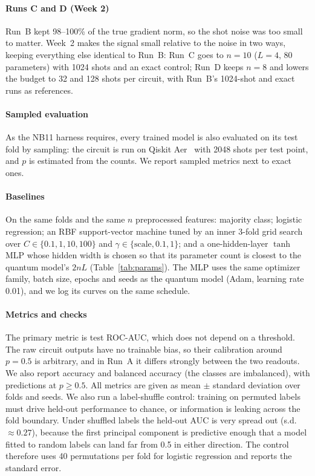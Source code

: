 \documentclass[conference]{IEEEtran}
\begin{document}
\paragraph*{Runs C and D (Week 2)} Run~B kept 98--100\% of the true gradient
norm, so the shot noise was too small to matter. Week~2 makes the signal
small relative to the noise in two ways, keeping everything else identical to Run~B:
Run~C goes to $n=10$ ($L=4$, 80 parameters) with 1024 shots and an exact
control; Run~D keeps $n=8$ and lowers the budget to 32 and 128 shots per
circuit, with Run~B's 1024-shot and exact runs as references.

\paragraph*{Sampled evaluation} As the NB11 harness requires, every trained
model is also evaluated on its test fold by sampling: the circuit is run on
Qiskit Aer~\cite{qiskit2024} with 2048 shots per test point, and $p$ is
estimated from the counts. We report sampled metrics next to exact ones.

\paragraph*{Baselines} On the same folds and the same $n$ preprocessed
features: majority class; logistic regression; an RBF support-vector machine
tuned by an inner 3-fold grid search over $C\in\{0.1,1,10,100\}$ and
$\gamma\in\{\text{scale},0.1,1\}$; and a one-hidden-layer $\tanh$ MLP whose
hidden width is chosen so that its parameter count is closest to the
quantum model's $2nL$ (Table~\ref{tab:params}). The MLP uses the same
optimizer family, batch size, epochs and seeds as the quantum model (Adam,
learning rate 0.01), and we log its curves on the same schedule.

\paragraph*{Metrics and checks} The primary metric is test ROC-AUC, which
does not depend on a threshold. The raw circuit outputs have no trainable bias, so
their calibration around $p=0.5$ is arbitrary, and in Run~A it differs strongly
between the two readouts. We also report accuracy and balanced accuracy (the
classes are imbalanced), with predictions at $p\ge0.5$. All metrics are given as
mean $\pm$ standard deviation over folds and seeds. We also run a label-shuffle
control: training on permuted labels must drive held-out performance to
chance, or information is leaking across the fold boundary. Under shuffled
labels the held-out AUC is very spread out (s.d.\ $\approx0.27$), because the first
principal component is predictive enough that a model fitted to random labels
can land far from 0.5 in either direction. The control therefore uses 40
permutations per fold for logistic regression and reports the standard error.
\end{document}

